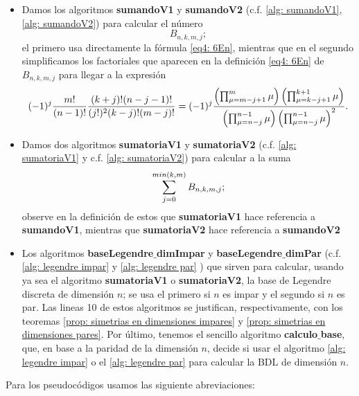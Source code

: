 \begin{itemize}
\item Damos los algoritmos \textbf{sumandoV1} y 
\textbf{sumandoV2} (c.f. \ref{alg: sumandoV1},
\ref{alg: sumandoV2}) para calcular el número
\begin{equation}
\label{eq0: 1Abril}
B_{n, k, m, j};
\end{equation}
el primero usa directamente la fórmula \eqref{eq4: 6En},
mientras que en el segundo 
simplificamos los factoriales que
aparecen en la definición \eqref{eq4: 6En}
de $B_{n,k,m,j}$
para llegar a la expresión
\[
(-1)^{j}
\frac{m!}{(n-1)!}
 \frac{(k+j)!(n-j-1)!}{(j!)^{2}(k-j)!(m-j)!}
= (-1)^{j}
\frac{\left( \prod_{\mu=m-j+1}^{m}{\mu} \right)
\left( \prod_{\mu=k-j+1}^{k+1}{\mu} \right)
}{
\left( \prod_{\mu=n-j}^{n-1}{\mu} \right)
\left( \prod_{\mu=n-j}^{n-1}{\mu} \right)^{2}
}.
\] 

\item Damos dos algoritmos \textbf{sumatoriaV1}
y \textbf{sumatoriaV2} (c.f. \ref{alg: sumatoriaV1}
y c.f. \ref{alg: sumatoriaV2}) para calcular a la suma
\begin{equation}
\label{eq1: 1Abril}
\sum\limits_{j=0}^{min(k,m)}B_{n, k, m, j};
\end{equation}
observe en la definición de estos que 
\textbf{sumatoriaV1} hace referencia a
\textbf{sumandoV1}, mientras que \textbf{sumatoriaV2}
hace referencia a \textbf{sumandoV2}


\item Los algoritmos 
\textbf{baseLegendre$\_$dimImpar} y
\textbf{baseLegendre$\_$dimPar} 
(c.f. \ref{alg: legendre impar} y \ref{alg: legendre par} )
que sirven para calcular, usando ya sea el algoritmo
\textbf{sumatoriaV1} o \textbf{sumatoriaV2},
la base de Legendre discreta de dimensión $n$; se usa el primero
si $n$ es impar y el segundo si $n$ es par.
Las lineas 10 de estos 
algoritmos se justifican,
respectivamente, con los teoremas 
\ref{prop: simetrias en dimensiones impares}
y \ref{prop: simetrias en dimensiones pares}.
Por último, tenemos el sencillo algoritmo \textbf{calculo$\_$base},
que, en base a la paridad de la dimensión $n$, decide si usar
el algoritmo \ref{alg: legendre impar} o el \ref{alg: legendre par}
para calcular la BDL de dimensión $n$.
\end{itemize}

Para los pseudocódigos usamos las siguiente abreviaciones:

